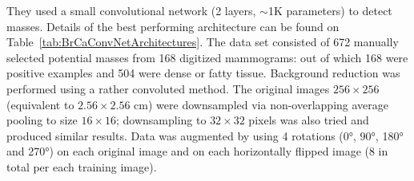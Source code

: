 \begin{comment}
- Experiment with single input image:
	single hidden layer network with variable feature maps and kernel size.
	Best results with kernel size 10 for 16 and 20 for 32.
	small grid search(needed to test more values).
	0.83 AUC
- GLDS texture features: contrast, angular second moment, enlropy and mean. Calculated at different subregions of the original 256 by 256 pixel image (it produces a 16 by 16 image).
- Experiment with GLDS plus pool-averaged image: 
	one hidden layer (3 feature maps, 10by 10 filter)
	16 by 16 raw input and one of the four possible GLDS
	good results already 0.86s 0.85
SGLD features: correlation, entropy, and difference entropy 
- Experiment with SGLD plus pool-averaged input:
	one hidden layer (3 feature maps, 10 by 10 filter)
	16 by 16 plus one
	NOt so good 0.84 AUC
- Good one: one of each plus index 
	one hidden layer
	varying kernel size and number of feature maps
	3 input images: pool-averaged, mean GLDS, SGLD correlation
- why not try imputing all possible GLDS+ all SLDS features+ raw  (8 feature maps) or deeper network? Probably because of no comp power
- give more info helps the AUC, maybe the improvement comes from the info lost by subsampling and the shallowness of the network, a deeper network with million parameters (and bigger input) will be able to learn the GLDS or SLDS features.
- texture images improve classification
- conv architecture not as important as texture images. (more image data/info)
- also points the need for bigger networks and the suboptimality of the hyperparamteer search (not all reasonable combination tried)
- no difference on 16 \times 16 vs 32 \times 32 (not sure about these because they were not one tested on the exact same architecture).
\end{comment}
They used a small convolutional network (2 layers, $\sim$1K parameters) to detect masses.
Details of the best performing architecture can be found on Table~\ref{tab:BrCaConvNetArchitectures}. The data set consisted of 672 manually selected potential masses from 168 digitized mammograms: out of which 168 were positive examples and 504 were dense or fatty tissue. Background reduction was performed using a rather convoluted method. The original images $256 \times 256$ (equivalent to $2.56 \times 2.56$ cm) were downsampled via non-overlapping average pooling to size $16\times 16$; downsampling to $32 \times 32$ pixels was also tried and produced similar results. Data was augmented by using 4 rotations (0°, 90°, 180° and 270°) on each original image and on each horizontally flipped image (8 in total per each training image).
